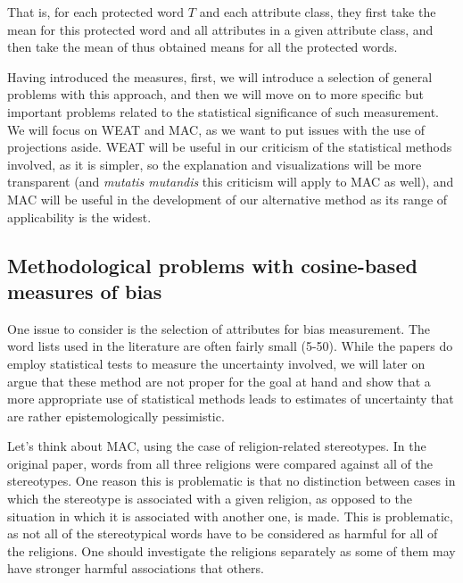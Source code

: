 \documentclass[
  10pt,
  dvipsnames,enabledeprecatedfontcommands, twocolumn]{scrartcl}
\begin{document}
\normalsize

\noindent That is, for each protected word \(T\) and each attribute
class, they first take the mean for this protected word and all
attributes in a given attribute class, and then take the mean of thus
obtained means for all the protected words.

Having introduced the measures, first, we will introduce a selection of
general problems with this approach, and then we will move on to more
specific but important problems related to the statistical significance
of such measurement. We will focus on WEAT and MAC, as we want to put
issues with the use of projections aside. WEAT will be useful in our
criticism of the statistical methods involved, as it is simpler, so the
explanation and visualizations will be more transparent (and
\emph{mutatis mutandis} this criticism will apply to MAC as well), and
MAC will be useful in the development of our alternative method as its
range of applicability is the widest.

\hypertarget{methodological-problems-with-cosine-based-measures-of-bias}{%
\subsection{Methodological problems with cosine-based measures of
bias}\label{methodological-problems-with-cosine-based-measures-of-bias}}

One issue to consider is the selection of attributes for bias
measurement. The word lists used in the literature are often fairly
small (5-50). While the papers do employ statistical
tests to measure the uncertainty involved, we will later on argue that
these method are not proper for the goal at hand and show that a more
appropriate use of statistical methods leads to estimates of uncertainty
that are rather epistemologically pessimistic.

Let's think about MAC, using the case of religion-related
stereotypes. In the
original paper, words from all three religions were compared against all
of the stereotypes. One reason this is problematic is that no
distinction between cases in which the stereotype is associated with a
given religion, as opposed to the situation in which it is associated
with another one, is made. This is problematic, as not all of the
stereotypical words have to be considered as harmful for all of the
religions. One should investigate the religions separately as some of
them may have stronger harmful associations that others.
\end{document}
